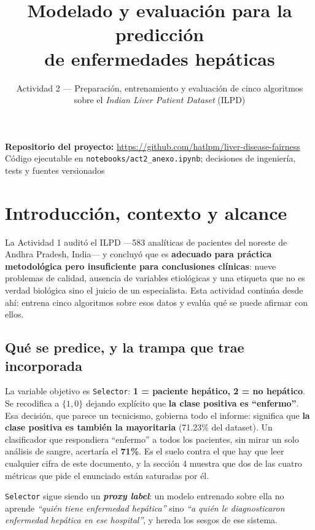 \documentclass[10pt,a4paper]{article}
\title{\vspace{-1.6cm}\textbf{Modelado y evaluación para la predicción\\de enfermedades hepáticas}}
\author{Actividad 2 --- Preparación, entrenamiento y evaluación de cinco algoritmos \\
sobre el \textit{Indian Liver Patient Dataset} (ILPD)}
\date{}
\begin{document}
\maketitle
\vspace{-1.1cm}
\begin{center}
\small
\textbf{Repositorio del proyecto:} \url{https://github.com/hatlpm/liver-disease-fairness}\\[0.15em]
\footnotesize Código ejecutable en \texttt{notebooks/act2\_anexo.ipynb}; decisiones de ingeniería, tests y fuentes versionados
\end{center}
\vspace{-0.5cm}

\section{Introducción, contexto y alcance}

La Actividad 1 auditó el ILPD ---583 analíticas de pacientes del noreste de Andhra Pradesh, India--- y concluyó que es \textbf{adecuado para práctica metodológica pero insuficiente para conclusiones clínicas}: nueve problemas de calidad, ausencia de variables etiológicas y una etiqueta que no es verdad biológica sino el juicio de un especialista. Esta actividad continúa desde ahí: entrena cinco algoritmos sobre esos datos y evalúa qué se puede afirmar con ellos.

\subsection{Qué se predice, y la trampa que trae incorporada}

La variable objetivo es \texttt{Selector}: \textbf{1 = paciente hepático, 2 = no hepático}. Se recodifica a $\{1, 0\}$ dejando explícito que \textbf{la clase positiva es ``enfermo''}. Esa decisión, que parece un tecnicismo, gobierna todo el informe: significa que \textbf{la clase positiva es también la mayoritaria} (71.23\% del dataset). Un clasificador que respondiera ``enfermo'' a todos los pacientes, sin mirar un solo análisis de sangre, acertaría el \textbf{71\%}. Es el suelo contra el que hay que leer cualquier cifra de este documento, y la sección 4 muestra que dos de las cuatro métricas que pide el enunciado están saturadas por él.

\texttt{Selector} sigue siendo un \textbf{\textit{proxy label}}: un modelo entrenado sobre ella no aprende \textit{``quién tiene enfermedad hepática''} sino \textit{``a quién le diagnosticaron enfermedad hepática en ese hospital''}, y hereda los sesgos de ese sistema.
\end{document}
